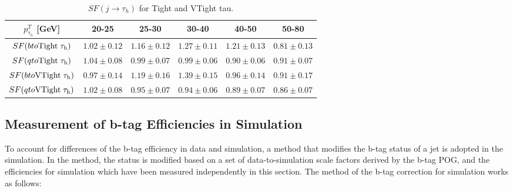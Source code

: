 \begin{table}[h]
    \setlength{\tabcolsep}{6pt} %
    \renewcommand{\arraystretch}{1.5} %
    \caption{ $SF (j\to \tau_h)$ for Tight and VTight tau.}
    
    \begin{tabular}{c|ccccc}
    \hline
    $p^T_{\tau_h}$ [GeV]  & 20-25         & 25-30         & 30-40         & 40-50         & 50-80         \\
    \hline
    $SF(b\to \rm{Tight} \; \tau_h)$  & $1.02\pm0.12$ & $1.16\pm0.12$ & $1.27\pm0.11$ & $1.21\pm0.13$ & $0.81\pm0.13$ \\
    $SF(q\to \rm{Tight} \;  \tau_h)$  & $1.04\pm0.08$ & $0.99\pm0.07$ & $0.99\pm0.06$ & $0.90\pm0.06$ & $0.91\pm0.07$ \\
    \hline
    $SF(b\to \rm{VTight} \; \tau_h)$ & $0.97\pm0.14$ & $1.19\pm0.16$ & $1.39\pm0.15$ & $0.96\pm0.14$ & $0.91\pm0.17$ \\
    $SF(q\to \rm{VTight} \; \tau_h)$ & $1.02\pm0.08$ & $0.95\pm0.07$ & $0.94\pm0.06$ & $0.89\pm0.07$ & $0.86\pm0.07$ \\
    \hline
    \end{tabular}
 
    \label{tab:appendix:fakeTauId:fit}
\end{table}


\FloatBarrier




\subsection{Measurement of b-tag Efficiencies in Simulation}
\label{sec:analysis:calibration:btag}




To account for differences of the b-tag efficiency in data and simulation, a method that modifies the b-tag status of a jet is adopted in the simulation. In the method, the status is modified based on a set of data-to-simulation scale factors derived by the b-tag POG, and the efficiencies for simulation which have been measured independently in this section.  The method of the b-tag correction for simulation works as follows:

